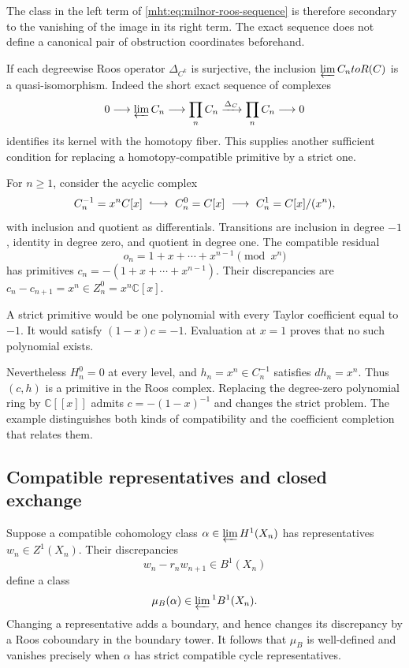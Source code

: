 The class in the left term of
\eqref{mht:eq:milnor-roos-sequence} is therefore secondary to the
vanishing of the image in its right term. The exact sequence does
not define a canonical pair of obstruction coordinates beforehand.

If each degreewise Roos operator $\Delta_{C^k}$ is surjective,
the inclusion $\varprojlim C_n\to\mathcal R(C)$ is a
quasi-isomorphism. Indeed the short exact sequence of complexes
\[
 0\longrightarrow\varprojlim C_n\longrightarrow
 \prod_n C_n\xrightarrow{\Delta_C}\prod_n C_n\longrightarrow0
\]
identifies its kernel with the homotopy fiber.
This supplies another sufficient condition for replacing a
homotopy-compatible primitive by a strict one.

\begin{example}\label{mht:ex:strict-versus-derived-primitives}
For $n\geq1$, consider the acyclic complex
\[
 C_n^{-1}=x^n\mathbb C[x]\ \lhook\joinrel\longrightarrow\
 C_n^0=\mathbb C[x]\ \longrightarrow\
 C_n^1=\mathbb C[x]/(x^n),
\]
with inclusion and quotient as differentials. Transitions are
inclusion in degree $-1$, identity in degree zero, and quotient in
degree one. The compatible residual
\[
 o_n=1+x+\cdots+x^{n-1}\pmod{x^n}
\]
has primitives $c_n=-(1+x+\cdots+x^{n-1})$. Their discrepancies are
$c_n-c_{n+1}=x^n\in Z^0_n=x^n\mathbb C[x]$.

A strict primitive would be one polynomial with every Taylor
coefficient equal to $-1$. It would satisfy $(1-x)c=-1$.
Evaluation at $x=1$ proves that no such polynomial exists.

Nevertheless $H^0_n=0$ at every level, and
$h_n=x^n\in C_n^{-1}$ satisfies $dh_n=x^n$.
Thus $(c,h)$ is a primitive in the Roos complex.
Replacing the degree-zero polynomial ring by $\mathbb C[[x]]$
admits $c=-(1-x)^{-1}$ and changes the strict problem.
The example distinguishes both kinds of compatibility and the
coefficient completion that relates them.
\end{example}

\subsection*{Compatible representatives and closed exchange}

Suppose a compatible cohomology class
$\alpha\in\varprojlim H^1(X_n)$ has representatives
$w_n\in Z^1(X_n)$. Their discrepancies
\[
 w_n-r_nw_{n+1}\in B^1(X_n)
\]
define a class
\begin{equation}\label{mht:eq:strict-representative-class}
 \mu_B(\alpha)\in\varprojlim{}^1 B^1(X_n).
\end{equation}
Changing a representative adds a boundary, and hence changes its
discrepancy by a Roos coboundary in the boundary tower. It follows
that $\mu_B$ is well-defined and vanishes precisely when
$\alpha$ has strict compatible cycle representatives.

